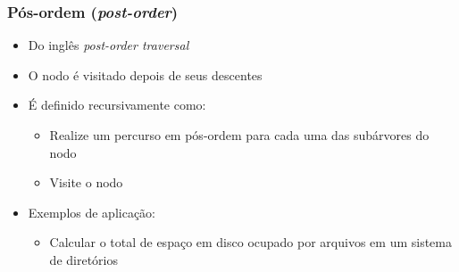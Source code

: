 \documentclass[aspectratio=169]{beamer}
\begin{document}
\begin{frame}\frametitle{Pós-ordem (\emph{post-order})}
\begin{itemize}
	\item Do inglês \emph{post-order traversal}
	\item O nodo é visitado depois de seus descentes
	\item É definido recursivamente como:
	\begin{itemize}
		\item Realize um percurso em pós-ordem para cada uma das subárvores do nodo
		\item Visite o nodo
	\end{itemize}
	\item Exemplos de aplicação:
	\begin{itemize}
		\item Calcular o total de espaço em disco ocupado por arquivos em um sistema de diretórios
	\end{itemize}
\end{itemize}
\end{frame}
\end{document}
